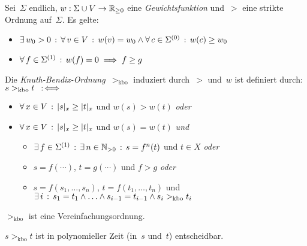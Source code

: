 \documentclass{cheat-sheet}
\newcommand{\size}[1]{\abs{{#1}}} %
\newcommand{\kbo}{>_\text{kbo}} %
\begin{document}



\begin{defn}
  Sei~$\Sigma$ endlich, $w : \Sigma \cup V \to \mathbb{R}_{\geq 0}$ eine \emph{Gewichtsfunktion} und~${>}$ eine strikte Ordnung auf~$\Sigma$.
  Es gelte:
  \begin{itemize}
    \item $\exists \, {w_0 > 0} \,:\, \forall \, {v \in V} \,:\, w(v) = w_0 \wedge \forall \, {c \in \Sigma^{(0)}} \,:\, w(c) \geq w_0$
    \item $\forall \, {f \in \Sigma^{(1)}} \,:\, w(f) = 0 \implies f \geq g$
  \end{itemize}
  Die \emph{Knuth-Bendix-Ordnung}~${\kbo}$ induziert durch~${>}$ und~$w$ ist definiert durch: $s \kbo t \coloniff\,$
  \begin{itemize}
    \item $\fa{x \in V} \size{s}_x \geq \size{t}_x$ und $w(s) > w(t)$ \textit{oder}
    \item $\fa{x \in V} \size{s}_x \geq \size{t}_x$ und $w(s) = w(t)$ \textit{und}
    \begin{itemize}
      \item $\exists \, {f \in \Sigma^{(1)}} \,:\, \exists \, {n \in \mathbb{N}_{> 0}} \,:\, s = f^n(t)$ und $t \in X$ \textit{oder}
      \item $s = f(\cdots)$, $t = g(\cdots)$ und $f > g$ \textit{oder}
      \item $s = f(s_1, \ldots, s_n)$, $t = f(t_1, \ldots, t_n)$ und $\ex{i} s_1 = t_1 \wedge \ldots \wedge s_{i-1} = t_{i-1} \wedge s_i \kbo t_i$
    \end{itemize}
  \end{itemize}
\end{defn}


\begin{thm}
  ${\kbo}$ ist eine Vereinfachungsordnung.
\end{thm}


\begin{prop}
  $s \kbo t$ ist in polynomieller Zeit (in~$s$ und~$t$) entscheidbar.
\end{prop}
\end{document}

